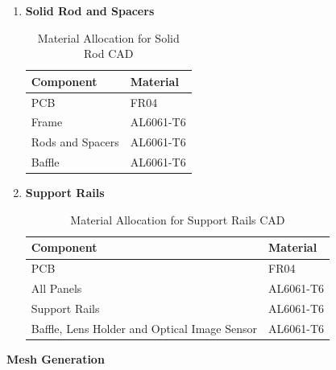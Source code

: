 \documentclass[../../main.tex]{subfiles}
\begin{document}
    
    \begin{enumerate}
        \item \textbf{Solid Rod and Spacers}
        \begin{table}[h!]
            \centering
            \begin{tabular}{|p{6cm}|p{3cm}|}
                \hline
                \textbf{Component} & \textbf{Material} \\
                \hline
                PCB & FR04 \\
                \hline
                Frame & AL6061-T6 \\
                \hline
                Rods and Spacers & AL6061-T6 \\
                \hline
                Baffle & AL6061-T6 \\
                \hline
            \end{tabular}
            \caption{Material Allocation for Solid Rod CAD}
            \label{tab:my_label}
        \end{table}
        \item \textbf{Support Rails}
        \begin{table}[H]
            \centering
            \begin{tabular}{|p{6cm}|p{3cm}|}
                \hline
                \textbf{Component} & \textbf{Material} \\
                \hline
                PCB & FR04 \\
                \hline
                All Panels & AL6061-T6 \\
                \hline
                Support Rails & AL6061-T6 \\
                \hline
                Baffle, Lens Holder and Optical Image Sensor & AL6061-T6 \\
                \hline    
            \end{tabular}
            \caption{Material Allocation for Support Rails CAD}
            \label{tab:my_label}
        \end{table}
    \end{enumerate}
    \item \textbf{Mesh Generation}
\end{document}
